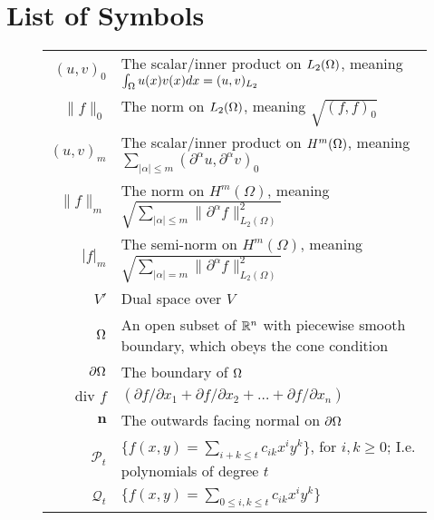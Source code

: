 \section*{List of Symbols}
\begin{center}
\begin{figure}[ht!]
\setlength{\extrarowheight}{10pt}
\begin{tabularx}{\textwidth}{rX}
$(u,v)_0$ &   The scalar/inner product on $L_2(\Omega)$, meaning $\int_\Omega u(x)v(x) dx =(u,v)_{L_2}$ \\
$\|f\|_0$ & The norm on $L_2(\Omega)$, meaning $\sqrt{(f,f)_0}$ \\
$(u,v)_m$ & The scalar/inner product on $H^m(\Omega)$, meaning $ \sum_{|\alpha|\leq m}(\partial ^{\alpha}u, \partial ^{\alpha} v)_0 $\\
$\|f\|_m$ & The norm on $H^m(\Omega)$, meaning $\sqrt{\sum_{|\alpha|\leq m}\|\partial ^\alpha f\|_{L_2(\Omega)}^2}$ \\
$|f|_m$ & The semi-norm on $H^m(\Omega)$, meaning $\sqrt{\sum_{|\alpha|= m}\|\partial ^\alpha f\|_{L_2(\Omega)}^2}$ \\
$V'$ & Dual space over $V$\\
$\Omega$ & An open subset of $\mathbb{R}^n$ with piecewise smooth boundary, which obeys the cone condition \\
$\partial\Omega$ & The boundary of $\Omega$\\
$\text{div }f$ & $(\partial f/\partial x_1+\partial f/\partial x_2+\ldots+\partial f/\partial x_n)$ \\
$\mathbf{n}$ & The outwards facing normal on $\partial \Omega$\\
$\mathcal{P}_t$ & $\{ f(x,y) = \sum_{i+k \leq t} c_{ik}x^i y^k \}$, for $i,k\geq 0$; I.e. polynomials of degree $t$ \\
$\mathcal{Q}_t$ & $\{ f(x,y)= \sum_{0\leq i,k \leq t} c_{ik}x^iy^k \}$ \\
\end{tabularx}
\end{figure}
\end{center}
\vfill
